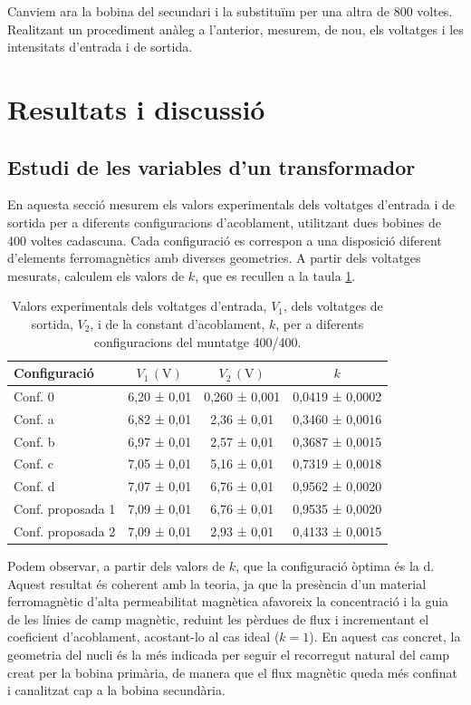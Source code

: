 \documentclass[a4paper,10.5pt]{report}
\begin{document}
Canviem ara la bobina del secundari i la substituïm per una altra de 800 voltes. Realitzant un procediment anàleg a l'anterior, mesurem, de nou, els voltatges i les intensitats d'entrada i de sortida.

\section{Resultats i discussió}
\subsection{Estudi de les variables d'un transformador}
En aquesta secció mesurem els valors experimentals dels voltatges d’entrada i de sortida per a diferents configuracions d’acoblament, utilitzant dues bobines de 400 voltes cadascuna. Cada configuració es correspon a una disposició diferent d’elements ferromagnètics amb diverses geometries. A partir dels voltatges mesurats, calculem els valors de $k$, que es recullen a la taula \ref{tab:4.1}.

\begin{table}[h]
	\centering
	\renewcommand{\arraystretch}{1.2}
	\caption{Valors experimentals dels voltatges d'entrada, $V_1$, dels voltatges de sortida, $V_2$, i de la constant d'acoblament, $k$, per a diferents configuracions del muntatge 400/400.}
	\begin{tabular}{lccc}
		\toprule
		Configuració & $V_1 \,(\mathrm{V})$ & $V_2 \,(\mathrm{V})$ & $k$ \\
		\midrule
		Conf. 0     & 6,20 ± 0,01 & 0,260 ± 0,001 & 0,0419 ± 0,0002 \\
		Conf. a     & 6,82 ± 0,01 & 2,36 ± 0,01   & 0,3460 ± 0,0016 \\
		Conf. b     & 6,97 ± 0,01 & 2,57 ± 0,01   & 0,3687 ± 0,0015 \\
		Conf. c     & 7,05 ± 0,01 & 5,16 ± 0,01   & 0,7319 ± 0,0018 \\
		Conf. d     & 7,07 ± 0,01 & 6,76 ± 0,01   & 0,9562 ± 0,0020 \\
		Conf. proposada 1  & 7,09 ± 0,01 & 6,76 ± 0,01   & 0,9535 ± 0,0020 \\
		Conf. proposada 2  & 7,09 ± 0,01 & 2,93 ± 0,01   & 0,4133 ± 0,0015 \\
		\bottomrule
	\end{tabular}
	\label{tab:4.1}
\end{table}

Podem observar, a partir dels valors de $k$, que la configuració òptima és la d. Aquest resultat és coherent amb la teoria, ja que la presència d’un material ferromagnètic d’alta permeabilitat magnètica afavoreix la concentració i la guia de les línies de camp magnètic, reduint les pèrdues de flux i incrementant el coeficient d’acoblament, acostant-lo al cas ideal ($k = 1$). En aquest cas concret, la geometria del nucli és la més indicada per seguir el recorregut natural del camp creat per la bobina primària, de manera que el flux magnètic queda més confinat i canalitzat cap a la bobina secundària.
\end{document}
